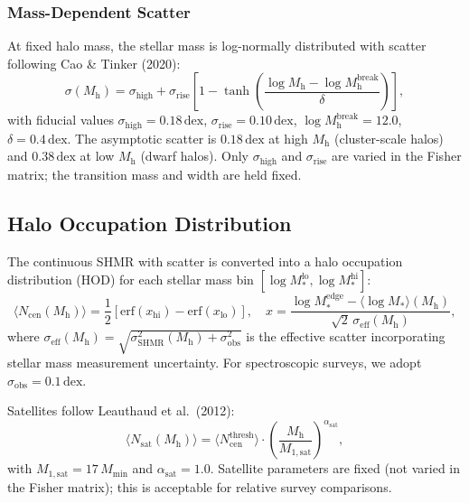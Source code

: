\documentclass[12pt, letterpaper]{article}
\newcommand{\Mh}{M_\mathrm{h}}
\newcommand{\Mstar}{M_*}
\newcommand{\seff}{\sigma_\mathrm{eff}}
\newcommand{\sobs}{\sigma_\mathrm{obs}}
\newcommand{\sSHMR}{\sigma_\mathrm{SHMR}}
\begin{document}
\subsubsection{Mass-Dependent Scatter}

At fixed halo mass, the stellar mass is log-normally distributed with
scatter following Cao \& Tinker (2020):
\begin{equation}
\sigma(\Mh) = \sigma_\mathrm{high} + \sigma_\mathrm{rise}
    \left[1 - \tanh\!\left(\frac{\log\Mh - \log\Mh^\mathrm{break}}
    {\delta}\right)\right],
\label{eq:scatter}
\end{equation}
with fiducial values $\sigma_\mathrm{high} = 0.18\,\mathrm{dex}$,
$\sigma_\mathrm{rise} = 0.10\,\mathrm{dex}$,
$\log\Mh^\mathrm{break} = 12.0$, $\delta = 0.4\,\mathrm{dex}$.
The asymptotic scatter is $0.18\,\mathrm{dex}$ at high $\Mh$
(cluster-scale halos) and $0.38\,\mathrm{dex}$ at low $\Mh$ (dwarf
halos).
Only $\sigma_\mathrm{high}$ and $\sigma_\mathrm{rise}$ are varied in
the Fisher matrix; the transition mass and width are held fixed.


\subsection{Halo Occupation Distribution}

The continuous SHMR with scatter is converted into a halo occupation
distribution (HOD) for each stellar mass bin $[\log\Mstar^\mathrm{lo},
\log\Mstar^\mathrm{hi}]$:
\begin{equation}
\langle N_\mathrm{cen}(\Mh)\rangle = \frac{1}{2}
    \left[\mathrm{erf}(x_\mathrm{hi}) -
          \mathrm{erf}(x_\mathrm{lo})\right],
\quad
x = \frac{\log\Mstar^\mathrm{edge} -
          \langle\log\Mstar\rangle(\Mh)}
         {\sqrt{2}\,\seff(\Mh)},
\label{eq:ncen}
\end{equation}
where $\seff(\Mh) = \sqrt{\sSHMR^2(\Mh) + \sobs^2}$ is the effective
scatter incorporating stellar mass measurement uncertainty.
For spectroscopic surveys, we adopt $\sobs = 0.1\,\mathrm{dex}$.

Satellites follow Leauthaud et al.\ (2012):
\begin{equation}
\langle N_\mathrm{sat}(\Mh)\rangle =
    \langle N_\mathrm{cen}^\mathrm{thresh}\rangle \cdot
    \left(\frac{\Mh}{M_{1,\mathrm{sat}}}\right)^{\alpha_\mathrm{sat}},
\end{equation}
with $M_{1,\mathrm{sat}} = 17\,M_\mathrm{min}$ and
$\alpha_\mathrm{sat} = 1.0$.
Satellite parameters are fixed (not varied in the Fisher matrix); this
is acceptable for relative survey comparisons.
\end{document}
